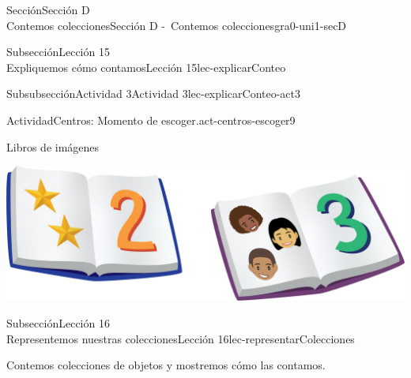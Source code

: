 \begin{sectionptx}{Sección}{{\Large Sección D\\}Contemos colecciones}{}{Sección D -~Contemos colecciones}{}{}{gra0-uni1-secD}
\begin{subsectionptx}{Subsección}{{\normalsize Lección 15\\[-0.05cm]}Expliquemos cómo contamos}{}{Lección 15}{}{}{lec-explicarConteo}
\begin{subsubsectionptx}{Subsubsección}{Actividad 3}{}{Actividad 3}{}{}{lec-explicarConteo-act3}
\begin{activity}{Actividad}{Centros: Momento de escoger.}{act-centros-escoger9}
\begin{sidebyside}{2}{0.025}{0.025}{0.05}
\begin{sbspanel}{0.45}
\end{sbspanel}%
\begin{sbspanel}{0.45}%
Libros de imágenes%
\par
\includegraphics[max width=\linewidth, center]{external/png-source/K.1.D Beta Student Workbooks.Books.png}
\end{sbspanel}%
\end{sidebyside}%
\end{activity}%
\end{subsubsectionptx}
\end{subsectionptx}
%
%
\typeout{************************************************}
\typeout{************************************************}
%
\begin{subsectionptx}{Subsección}{{\normalsize Lección 16\\[-0.05cm]}Representemos nuestras colecciones}{}{Lección 16}{}{}{lec-representarColecciones}
\begin{introduction}{}%
Contemos colecciones de objetos y mostremos cómo las contamos.%
\end{introduction}%
%
%
\typeout{************************************************}
\typeout{************************************************}
%
%
%
\typeout{************************************************}
\typeout{************************************************}
%

\end{subsectionptx}
\end{sectionptx}
